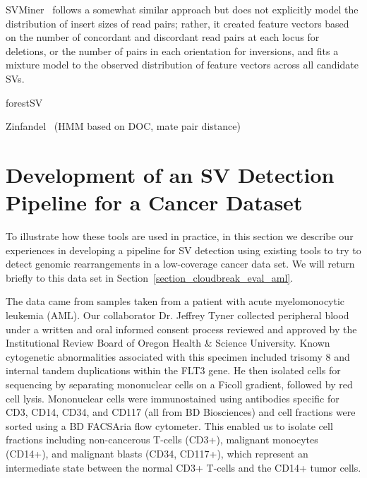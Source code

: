 SVMiner~\cite{Hayes:2012ia} follows a somewhat similar approach but does not explicitly model the distribution of insert sizes of read pairs; rather, it created feature vectors based on the number of concordant and discordant read pairs at each locus for deletions, or the number of pairs in each orientation for inversions, and fits a mixture model to the observed distribution of feature vectors across all candidate SVs.

forestSV~\cite{Michaelson:2012fj}

Zinfandel~\cite{Shen:2011ku} (HMM based on DOC, mate pair distance)

\section{Development of an SV Detection Pipeline for a Cancer Dataset}\label{section_aml_pipeline}

To illustrate how these tools are used in practice, in this section we describe our experiences in developing a pipeline for SV detection using existing tools to try to detect genomic rearrangements in a low-coverage cancer data set. We will return briefly to this data set in Section~\ref{section_cloudbreak_eval_aml}.

The data came from samples taken from a patient with acute myelomonocytic leukemia (AML). Our collaborator Dr. Jeffrey Tyner collected peripheral blood under a written and oral informed consent process reviewed and approved by the Institutional Review Board of Oregon Health \& Science University. Known cytogenetic abnormalities associated with this specimen included trisomy 8 and internal tandem duplications within the FLT3 gene. He then isolated cells for sequencing by separating mononuclear cells on a Ficoll gradient, followed by red cell lysis. Mononuclear cells were immunostained using antibodies specific for CD3, CD14, CD34, and CD117 (all from BD Biosciences) and cell fractions were sorted using a BD FACSAria flow cytometer. This enabled us to isolate cell fractions including non-cancerous T-cells (CD3+), malignant monocytes (CD14+), and malignant blasts (CD34, CD117+), which represent an intermediate state between the normal CD3+ T-cells and the CD14+ tumor cells. 

